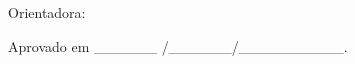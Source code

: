 \begin{folhadeaprovacao}

\begin{center}

{\ABNTEXchapterfont\large\imprimirautor}

\vspace{3.5cm}


{\ABNTEXchapterfont\bfseries\Large\imprimirtitulo}


\end{center}

\vspace{1.0cm}

\hspace{.39\textwidth} 
\begin{minipage}{.5\textwidth}
\fontsize{10pt}{\baselineskip}\selectfont \imprimirpreambulo

Orientadora: \imprimirorientador
\end{minipage}


\vspace{2cm}


\begin{center}

Aprovado em \_\_\_\_\_\_ /\_\_\_\_\_\_/\_\_\_\_\_\_\_\_\_\_.

\vspace{1cm}




\end{center}

\end{folhadeaprovacao}